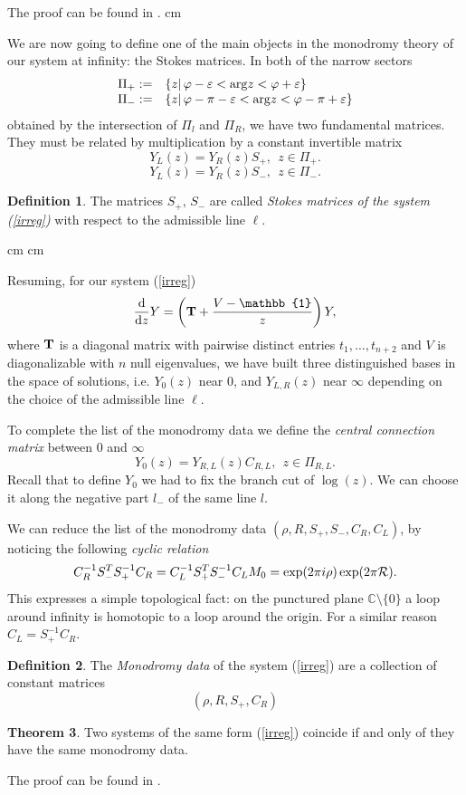 \documentclass[12pt]{article}
\def\ddz{{{\rm d}\over{\rm d} z}}
\def\phi{\varphi}
\def\arg{{\rm arg}}
\newcommand{\ID}{\mathbb{1}}
\newcommand{\complessi}{\mathbb C}
\theoremstyle{definition}
\newtheorem{df}{Definition}
\theoremstyle{theorem}
\newtheorem{thm}[df]{Theorem}
\begin{document}
\noindent The proof can be found in \cite{BJL}.
 cm

We are now going to define one of the main objects in the monodromy 
theory of our system at infinity: the Stokes matrices.
In both of the narrow sectors 
$$
\begin{array}{cl}
\Pi_+:=&\{z|\, \phi-\varepsilon< \arg z<\phi+\varepsilon\}\\
\Pi_-:=&\{z|\,\phi-\pi-\varepsilon< \arg z<\phi-\pi+\varepsilon\}\\
\end{array}
$$
obtained by the intersection of $\Pi_l$ and $\Pi_R$, %
we have two fundamental matrices. They must be related by multiplication 
by a constant invertible matrix
$$
Y_L (z) =Y_R (z) S_+, ~~z\in \Pi_+.
$$
$$
Y_L (z) =Y_R (z) S_-, ~~z\in \Pi_-.
$$


\begin{df}
The matrices $S_+$, $S_-$ are called {\it Stokes
matrices of the system (\ref{irreg})}\/ with respect to the admissible
line $\ell$.
\label{def8}\end{df}


 cm
 cm

Resuming, for our system (\ref{irreg})
$$
\ddz Y=\left({\bf T}+{V-\ID\over z} \right) Y,
$$
where ${\bf T}$ is a diagonal matrix with pairwise distinct entries 
$t_1,\dots,t_{n+2}$ and $V$ is diagonalizable with $n$ null eigenvalues, 
we have built three 
distinguished bases in the space  of solutions, i.e. $Y_0(z)$ near
$0$, and $Y_{L,R}(z)$ near $\infty$ depending on the choice of
the admissible line $\ell$. 

To complete the list of the monodromy data we define the {\it central 
connection matrix}\/ between $0$ and $\infty$
$$
Y_0(z) =Y_{R,L}(z)C_{R,L}, ~~z\in \Pi_{R,L}.
$$
Recall that to define $Y_0$ we had to fix the branch cut of
$\log(z)$. We can choose it along the negative part $l_-$ of the 
same line $l$. 

We can reduce the list of the monodromy data $(\rho,R,S_+,S_-,C_R,C_L)$,
by noticing the following {\it cyclic relation}
$$
C_R^{-1}S_-^T S_+^{-1}C_R=C_L^{-1}S_+^T S_-^{-1}C_LM_0 =
\exp(2\pi i\rho)\exp(2\pi{\cal R}).
$$
This expresses a simple topological fact: on the punctured plane 
$\complessi\setminus\{0\}$ a loop around infinity is homotopic to 
a loop around the origin. For a similar reason $C_L=S_+^{-1}C_R$. 

\begin{df}
The {\it Monodromy data}\/ of the system (\ref{irreg}) are a collection of 
constant matrices
$$
\left(\rho,R,S_+,C_R\right)
$$
\label{def9}\end{df}


\begin{thm}
Two systems of the same form (\ref{irreg}) coincide if and only of they have 
the same monodromy data.
\label{th4}\end{thm}

The proof can be found in \cite{Dub7}.






\end{document}
